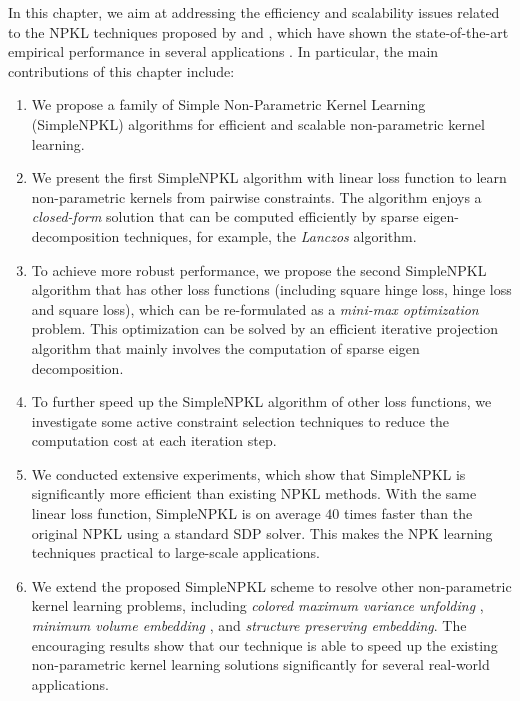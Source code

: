 In this chapter, we aim at addressing the efficiency and scalability issues related to the NPKL techniques proposed by \cite{icml/HoiJL07} and \cite{icml/ZhuangTH09}, which have shown the state-of-the-art empirical performance in several applications \cite{civr/ZhuangH10}. In particular, the main contributions of this chapter include:
\begin{enumerate}
\item We propose a family of Simple Non-Parametric Kernel Learning (SimpleNPKL) algorithms for efficient and scalable non-parametric kernel learning.

\item We present the first SimpleNPKL algorithm with linear loss function to learn non-parametric kernels from pairwise constraints. The algorithm enjoys a {\em closed-form} solution that can be computed efficiently by sparse eigen-decomposition techniques, for example, the \emph{Lanczos} algorithm.

\item To achieve more robust performance, we propose the second SimpleNPKL algorithm that has other loss functions (including square hinge loss, hinge loss and square loss), which can be re-formulated as a {\it mini-max optimization} problem. This optimization can be solved by an efficient iterative projection algorithm that mainly involves the computation of sparse eigen decomposition.

\item To further speed up the SimpleNPKL algorithm of other loss functions, we investigate some active constraint selection techniques to reduce the computation cost at each iteration step.

\item We conducted extensive experiments, which show that SimpleNPKL is significantly more efficient than existing NPKL methods. With the same linear loss function, SimpleNPKL is on average $40$ times faster than the original NPKL using a standard SDP solver. This makes the NPK learning techniques practical to large-scale applications.

\item We extend the proposed SimpleNPKL scheme to resolve other
non-parametric kernel learning problems, including {\em colored maximum
variance unfolding} \cite{nips/SongSBG07}, {\em minimum volume
embedding} \cite{aistats/ShawJ07}, and {\em structure preserving embedding}\cite{icml/ShawJ09}. The encouraging results show that our technique is able to speed up the existing non-parametric kernel learning solutions significantly for several real-world applications.
\end{enumerate}

